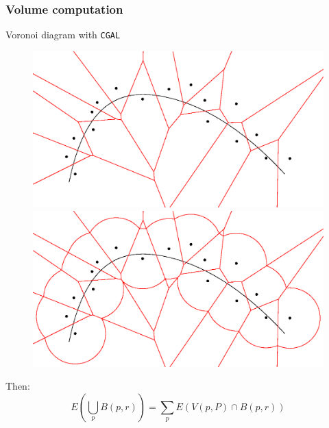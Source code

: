 \documentclass{beamer}
\begin{document}
\begin{frame}
    \frametitle{Volume computation}

    Voronoi diagram with \texttt{CGAL}
    \begin{figure}
        \centering
        \includegraphics[scale=0.28]{img/voronoi-curve-2d}
        \hfill
        \includegraphics[scale=0.28]{img/voronoi-offset-2d}
    \end{figure}

    Then:
    $$ E \left( \bigcup_p B(p, r) \right) = \sum_p E(V(p, P) \cap B(p, r)) $$
\end{frame}
\end{document}
